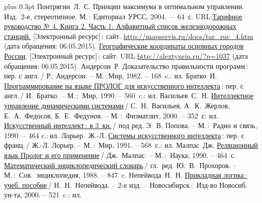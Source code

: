 \documentclass[a4paper,14pt, openany, twoside, draft]{extbook} %
\def\emphbib#1{#1}
\begin{document}
\begin{thebibliography}{99}\itemsep1pt \parskip 0pt plus 0.3pt
 Понтрягин~Л.~С. Принцип максимума в оптимальном управлении. Изд.~2-е, стереотипное. М.\,: Едиториал УРСС,  2004.~--~64~с.
 URL:\href{http://mapservis.ru/docs/tar_ruc_4.htm}{Тарифное руководство № 4. Книга 2. Часть 1. Алфавитный список железнодорожных станций.} [Электронный ресурс]\,{}: сайт. \url{http://mapservis.ru/docs/tar_ruc_4.htm} (дата обращения: 06.05.2015).
 \href{http://alextyurin.ru/?p=1037}{Географические координаты основных городов России}. [Электронный ресурс]\,{}: сайт. URL:\url{http://alextyurin.ru/?p=1037} (дата обращения: 06.05.2015).
 Андерсон~Р. \emphbib{Доказательство правильности программ}\,{}: пер. с англ.\,{}/ Р.~Андерсон. -- М.\,:\,Мир, 1982. -- 168~c.: ил.
 Братко~И. \emphbib{\href{http://royallib.ru/book/bratko_ivan/programmirovanie_na_yazike_prolog_dlya_iskusstvennogo_intellekta.html}{Программирование на языке ПРОЛОГ для искусственного интеллекта}}\,{}: пер. с англ.\,/ И.~Братко. -- М.\,:~Мир, 1990. -- 560~c.: ил.
 Васильев~С.~Н. \emphbib{\href{http://bookfi.org/book/616050}{Интеллектное управление динамическими системами}}\,{}/ С.~Н.~Васильев, А.~К.~Жерлов, Е.~А.~Федосов, Б.~Е.~Федунов. -- М.\,:~Физматлит, 2000. -- 352~с: ил.
 \emphbib{\href{http://aihandbook.intsys.org.ru/index.php/intro/ai-handbook}{Искусственный интеллект\,{}: в 3~кн.}}\,{}/ под ред. Э.~В. Попова. -- М.\,:~Радио и связь, 1990. -- 464 c.:\,{}ил.
 Лорьер.~Ж.-Л.  \emphbib{\href{http://publ.lib.ru/ARCHIVES/L/LOR'ER_Jan_Lui/_Lor'er_J.L..html}{Системы искусственного интеллекта}\,{}: пер. с франц.}\,{}/ Ж.-Л. Лорьер. -- М.\,:~Мир, 1991. -- 568~с.: ил.
 Малпас~Дж. \emphbib{\href{http://padaread.com/?book=40731&pg=1}{Реляционный язык Пролог и его применение}}\,{}/ Дж.~Малпас. -- М.\,:~Наука, 1990. -- 464~с.
 \emphbib{\href{https://app.box.com/shared/793ukgvblxmj0hh6btw4}{Математический энциклопедический словарь}}\,{}/ гл.~ред. Ю.~В.~Прохоров. -- М.\,:~Сов.~энциклопедия, 1988. -- 847~c.
 Непейвода~Н.~Н. \emphbib{\href{http://www.logic-books.info/taxonomy/term/215}{Прикладная логика\,{}: учеб. пособие}}\,{}/ Н.~Н.~Непейвода. -- 2-е изд. -- Новосибирск\,{}:~Изд-во Новосиб. ун-та, 2000. -- 521~c.: ил.

\end{thebibliography}
\end{document}
